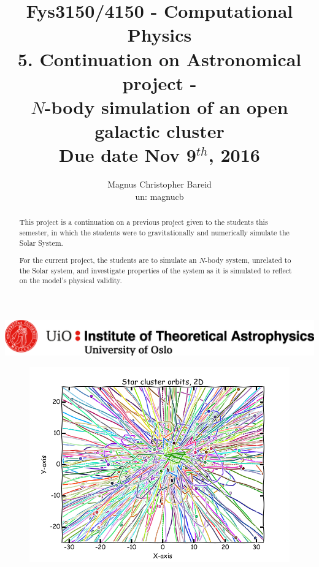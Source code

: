 \documentclass[11pt,a4paper,notitlepage,twocolumn]{article}
\title{\normalsize Fys3150/4150 - Computational Physics\\
\vspace{10mm}
\huge 5. Continuation on Astronomical project -\\ $N$-body simulation of an open galactic cluster\\
\vspace{10mm}
\normalsize Due date {\bf Nov 9$^{th}$, 2016}}
\author{Magnus Christopher Bareid \\ un: magnucb }
\begin{document}
\vspace{5mm}

\begin{titlingpage}
	\begin{center}
    	\includegraphics[scale=0.5]{../ITA_seal.png}
    	\let\newpage\relax\maketitle

		\begin{figure}[H]
		\center
		\includegraphics[scale=0.5]{../figs/frontpage.png}
		\end{figure}

		\begin{abstract}
This project is a continuation on a previous project given to the students this semester, in which the students were to gravitationally and numerically simulate the Solar System.

For the current project, the students are to simulate an $N$-body system, unrelated to the Solar system, and investigate properties of the system as it is simulated to reflect on the model's physical validity.
		\end{abstract}

		\newpage
		\tableofcontents

	\end{center}
\end{titlingpage}
\end{document}

